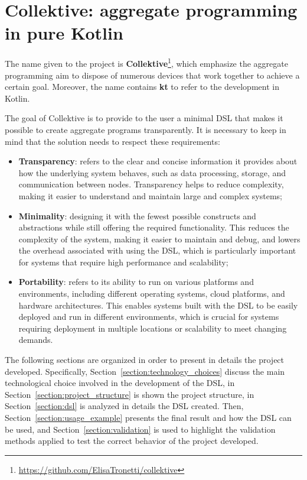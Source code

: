 \chapter{Collektive: aggregate programming in pure Kotlin}\label{chapter:collektive}
The name given to the project is \textbf{Collektive}\footnote{\url{https://github.com/ElisaTronetti/collektive}}, which emphasize the aggregate programming aim to dispose of numerous devices that work together to achieve a certain goal. Moreover, the name contains \textbf{kt} to refer to the development in Kotlin.

The goal of Collektive is to provide to the user a minimal DSL that makes it possible to create aggregate programs transparently. It is necessary to keep in mind that the solution needs to respect these requirements:
\begin{itemize}
    \item \textbf{Transparency}: refers to the clear and concise information it provides about how the underlying system behaves, such as data processing, storage, and communication between nodes. Transparency helps to reduce complexity, making it easier to understand and maintain large and complex systems;
    \item \textbf{Minimality}: designing it with the fewest possible constructs and abstractions while still offering the required functionality. This reduces the complexity of the system, making it easier to maintain and debug, and lowers the overhead associated with using the DSL, which is particularly important for systems that require high performance and scalability;
    \item \textbf{Portability}: refers to its ability to run on various platforms and environments, including different operating systems, cloud platforms, and hardware architectures. This enables systems built with the DSL to be easily deployed and run in different environments, which is crucial for systems requiring deployment in multiple locations or scalability to meet changing demands.
\end{itemize}

The following sections are organized in order to present in details the project developed. Specifically, Section~\ref{section:technology_choices} discuss the main technological choice involved in the development of the DSL, in Section~\ref{section:project_structure} is shown the project structure, in Section~\ref{section:dsl} is analyzed in details the DSL created. Then, Section~\ref{section:usage_example} presents the final result and how the DSL can be used, and Section~\ref{section:validation} is used to highlight the validation methods applied to test the correct behavior of the project developed.

